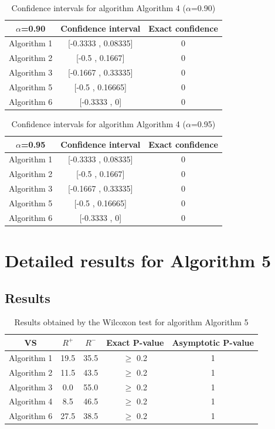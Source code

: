 \documentclass[a4paper,10pt]{article}
\begin{document}
\begin{table}[!htp]
\centering\small
\begin{tabular}{
|c|c|c|}
\hline
 $\alpha$=0.90 & Confidence interval & Exact confidence \\ \hline 
Algorithm 1 & [-0.3333 , 0.08335] & 0\\ \hline 
Algorithm 2 & [-0.5 , 0.1667] & 0\\ \hline 
Algorithm 3 & [-0.1667 , 0.33335] & 0\\ \hline 
Algorithm 5 & [-0.5 , 0.16665] & 0\\ \hline 
Algorithm 6 & [-0.3333 , 0] & 0\\ \hline 

\end{tabular}
\caption{Confidence intervals for algorithm Algorithm 4 ($\alpha$=0.90)}
\end{table}
\begin{table}[!htp]
\centering\small
\begin{tabular}{
|c|c|c|}
\hline
 $\alpha$=0.95 & Confidence interval & Exact confidence \\ \hline 
Algorithm 1 & [-0.3333 , 0.08335] & 0\\ \hline 
Algorithm 2 & [-0.5 , 0.1667] & 0\\ \hline 
Algorithm 3 & [-0.1667 , 0.33335] & 0\\ \hline 
Algorithm 5 & [-0.5 , 0.16665] & 0\\ \hline 
Algorithm 6 & [-0.3333 , 0] & 0\\ \hline 

\end{tabular}
\caption{Confidence intervals for algorithm Algorithm 4 ($\alpha$=0.95)}
\end{table}

 \clearpage 


\section{Detailed results for Algorithm 5}


\subsection{Results}

\begin{table}[!htp]
\centering\small
\begin{tabular}{
|c|c|c|c|c|}
\hline
 VS & $R^{+}$ & $R^{-}$ & Exact P-value & Asymptotic P-value \\ \hline 
Algorithm 1 & 19.5 & 35.5 & $\geq$ 0.2 & 1\\ \hline 
Algorithm 2 & 11.5 & 43.5 & $\geq$ 0.2 & 1\\ \hline 
Algorithm 3 & 0.0 & 55.0 & $\geq$ 0.2 & 1\\ \hline 
Algorithm 4 & 8.5 & 46.5 & $\geq$ 0.2 & 1\\ \hline 
Algorithm 6 & 27.5 & 38.5 & $\geq$ 0.2 & 1\\ \hline 

\end{tabular}
\caption{Results obtained by the Wilcoxon test for algorithm Algorithm 5}
\end{table}
\end{document}
